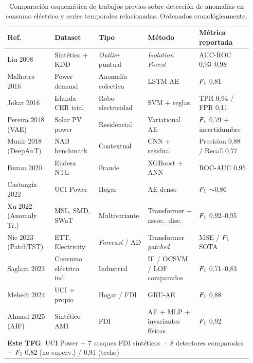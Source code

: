 \begin{table}[H]
\centering
\caption{Comparación esquemática de trabajos previos sobre detección de anomalías en consumo eléctrico y series temporales relacionadas. Ordenados cronológicamente.}
\label{tab:soa}
\footnotesize
\begin{tabularx}{\textwidth}{l X l l l}
\toprule
Ref. & Dataset & Tipo & Método & Métrica reportada \\
\midrule
Liu 2008 \cite{liu2008isolation}              & Sintético + KDD       & \textit{Outlier} puntual    & \textit{Isolation Forest}          & AUC-ROC 0{,}93--0{,}98 \\
Malhotra 2016 \cite{malhotra2016lstmae}       & Power demand          & Anomalía colectiva          & LSTM-AE                            & $F_{1}$ 0{,}81 \\
Jokar 2016 \cite{jokar2016electricity}        & Irlanda CER trial     & Robo electricidad           & SVM + reglas                       & TPR 0{,}94 / FPR 0{,}11 \\
Pereira 2018 (VAE) \cite{pereira2018unsupervised} & Solar PV power     & Residencial                 & Variational AE                     & $F_{1}$ 0{,}79 + incertidumbre \\
Munir 2018 (DeepAnT) \cite{munir2018deepant}  & NAB benchmark         & Contextual                  & CNN + residual                     & Precision 0{,}88 / Recall 0{,}77 \\
Buzau 2020 \cite{buzau2020hybrid}             & Endesa NTL            & Fraude                      & XGBoost + ANN                      & ROC-AUC 0{,}95 \\
Castangia 2022 \cite{castangia2022density}    & UCI Power             & Hogar                       & AE denso                           & $F_{1}$ $\sim$0{,}86 \\
Xu 2022 (Anomaly Tr.) \cite{xu2022anomaly}    & MSL, SMD, SWaT        & Multivariante               & Transformer + assoc.\ disc.        & $F_{1}$ 0{,}92--0{,}95 \\
Nie 2023 (PatchTST) \cite{nie2023patchtst}    & ETT, Electricity      & \textit{Forecast} / AD      & Transformer \emph{patched}         & MSE / $F_{1}$ SOTA \\
Saglam 2023 \cite{saglam2023ml}               & Consumo eléctrico ind.& Industrial                  & IF / OCSVM / LOF comparados        & $F_{1}$ 0{,}71--0{,}83 \\
Mehedi 2024 \cite{mehedi2024gruae}            & UCI + propio          & Hogar / FDI                 & GRU-AE                             & $F_{1}$ 0{,}88 \\
Ahmad 2025 (AIF) \cite{ahmad2025aif}          & Sintético AMI         & FDI                         & AE + MLP + invariantes físicas     & $F_{1}$ 0{,}92 \\
\midrule
\multicolumn{5}{l}{\footnotesize\textbf{Este TFG}: UCI Power + 7 ataques FDI sintéticos · 8 detectores comparados · $F_{1}$ 0{,}82 (no superv.) / 0{,}91 (techo)} \\
\bottomrule
\end{tabularx}
\end{table}

